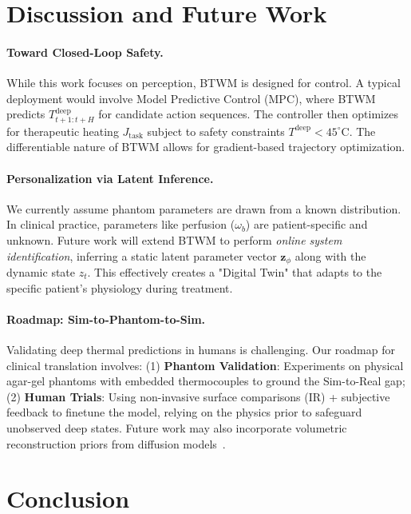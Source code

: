 \documentclass{article}
\begin{document}
\section{Discussion and Future Work}
\label{sec:discussion}

\paragraph{Toward Closed-Loop Safety.}
While this work focuses on perception, BTWM is designed for control. A typical deployment would involve Model Predictive Control (MPC), where BTWM predicts $T_{t+1:t+H}^{\mathrm{deep}}$ for candidate action sequences. The controller then optimizes for therapeutic heating $J_{\mathrm{task}}$ subject to safety constraints $T^{\mathrm{deep}} < 45^\circ$C. The differentiable nature of BTWM allows for gradient-based trajectory optimization.

\paragraph{Personalization via Latent Inference.}
We currently assume phantom parameters are drawn from a known distribution. In clinical practice, parameters like perfusion ($\omega_b$) are patient-specific and unknown. Future work will extend BTWM to perform \emph{online system identification}, inferring a static latent parameter vector $\mathbf{z}_{\phi}$ along with the dynamic state $z_t$. This effectively creates a "Digital Twin" that adapts to the specific patient's physiology during treatment.

\paragraph{Roadmap: Sim-to-Phantom-to-Sim.}
Validating deep thermal predictions in humans is challenging. Our roadmap for clinical translation involves: (1) \textbf{Phantom Validation}: Experiments on physical agar-gel phantoms with embedded thermocouples to ground the Sim-to-Real gap; (2) \textbf{Human Trials}: Using non-invasive surface comparisons (IR) + subjective feedback to finetune the model, relying on the physics prior to safeguard unobserved deep states. Future work may also incorporate volumetric reconstruction priors from diffusion models~\cite{wang2026beyond}.


\section{Conclusion}
\label{sec:conclusion}
\end{document}
